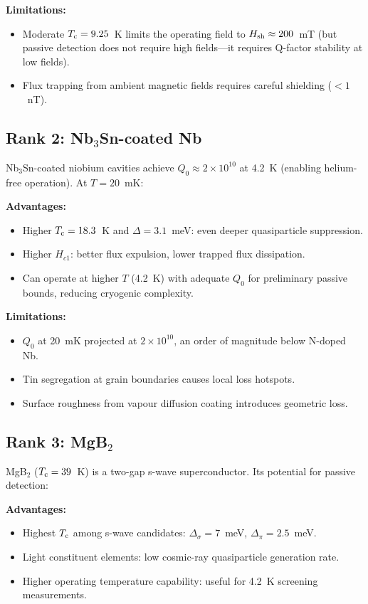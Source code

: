 \documentclass[11pt]{article}
\theoremstyle{definition}
\theoremstyle{remark}
\newcommand{\ee}[1]{\times 10^{#1}}
\newcommand{\Tc}{T_{\rm c}}
\begin{document}
\textbf{Limitations:}
\begin{itemize}[nosep]
  \item Moderate $\Tc = 9.25$~K limits the operating field to
    $H_{\rm sh} \approx 200$~mT (but passive detection does not require
    high fields---it requires Q-factor stability at low fields).
  \item Flux trapping from ambient magnetic fields requires careful
    shielding ($< 1$~nT).
\end{itemize}

\subsection{Rank 2: Nb$_3$Sn-coated Nb}

Nb$_3$Sn-coated niobium cavities achieve $Q_0 \approx 2\ee{10}$ at
4.2~K (enabling helium-free operation). At $T = 20$~mK:

\textbf{Advantages:}
\begin{itemize}[nosep]
  \item Higher $\Tc = 18.3$~K and $\Delta = 3.1$~meV: even deeper
    quasiparticle suppression.
  \item Higher $H_{c1}$: better flux expulsion, lower trapped flux
    dissipation.
  \item Can operate at higher $T$ (4.2~K) with adequate $Q_0$ for
    preliminary passive bounds, reducing cryogenic complexity.
\end{itemize}

\textbf{Limitations:}
\begin{itemize}[nosep]
  \item $Q_0$ at 20~mK projected at $2\ee{10}$, an order of magnitude
    below N-doped Nb.
  \item Tin segregation at grain boundaries causes local loss hotspots.
  \item Surface roughness from vapour diffusion coating introduces
    geometric loss.
\end{itemize}

\subsection{Rank 3: MgB$_2$}

MgB$_2$ ($\Tc = 39$~K) is a two-gap s-wave superconductor. Its potential
for passive detection:

\textbf{Advantages:}
\begin{itemize}[nosep]
  \item Highest $\Tc$ among s-wave candidates: $\Delta_\sigma = 7$~meV,
    $\Delta_\pi = 2.5$~meV.
  \item Light constituent elements: low cosmic-ray quasiparticle
    generation rate.
  \item Higher operating temperature capability: useful for 4.2~K
    screening measurements.
\end{itemize}
\end{document}
